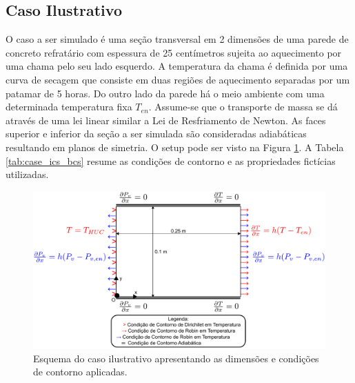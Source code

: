     \subsection{Caso Ilustrativo}\label{mat:caso}
    O caso a ser simulado é uma seção transversal em 2 dimensões de uma parede
    de concreto refratário com espessura de 25 centímetros sujeita ao
    aquecimento por uma chama pelo seu lado esquerdo. A temperatura da chama é
    definida por uma curva de secagem que consiste em duas regiões de
    aquecimento separadas por um patamar de 5 horas. Do outro lado da parede há
    o meio ambiente com uma determinada temperatura fixa $T_{en}$. Assume-se que
    o transporte de massa se dá através de uma lei linear similar a Lei de
    Resfriamento de Newton. As faces superior e inferior da seção a ser simulada
    são consideradas adiabáticas resultando em planos de simetria. O setup pode
    ser visto na Figura \ref{fig:case}. A Tabela \ref{tab:case_ics_bcs}  resume
    as condições de contorno e as propriedades fictícias utilizadas.

  \begin{figure}[ht]
	\centering
	\includegraphics[width=14cm]{./figures/case.pdf}
	\caption{Esquema do caso ilustrativo apresentando as dimensões e condições de
    contorno aplicadas.  \label{fig:case}}
  \end{figure}

  \setlength{\tabcolsep}{38pt}
  
